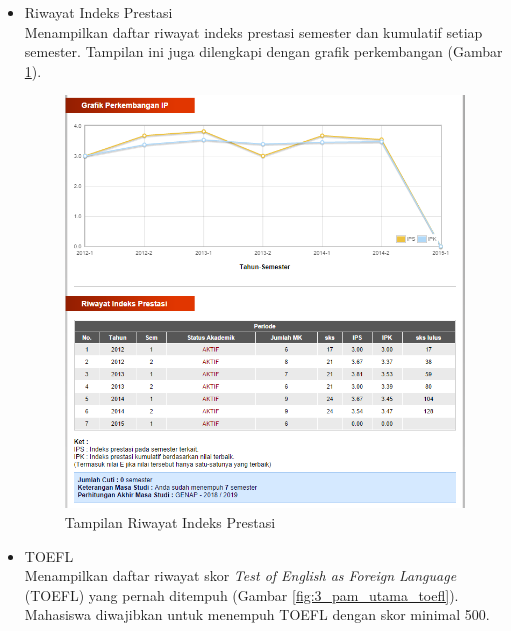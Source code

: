 \documentclass[a4paper,twoside]{article}
\begin{document}
\begin{enumerate}
\begin{enumerate}
\begin{enumerate}
\begin{itemize}
\begin{itemize}
			\item Riwayat Indeks Prestasi \\
			Menampilkan daftar riwayat indeks prestasi semester dan kumulatif setiap semester. Tampilan ini juga dilengkapi dengan grafik perkembangan (Gambar \ref{fig:3_pam_utama_ip}). 
			\begin{figure}[H]
				\centering
				\includegraphics[scale=0.5]{Gambar/pam-utama-ip}
				\caption{Tampilan Riwayat Indeks Prestasi} 
				\label{fig:3_pam_utama_ip}
			\end{figure}
			
			\item TOEFL \\
			Menampilkan daftar riwayat skor \textit{Test of English as Foreign Language} (TOEFL) yang pernah ditempuh (Gambar \ref{fig:3_pam_utama_toefl}). Mahasiswa diwajibkan untuk menempuh TOEFL dengan skor minimal 500.
			

\end{itemize}
\end{itemize}
\end{enumerate}
\end{enumerate}
\end{enumerate}
\end{document}
